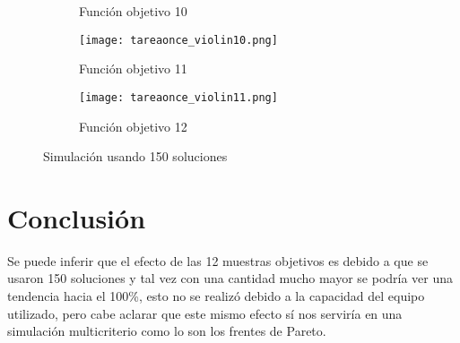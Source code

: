 \documentclass{article}
\begin{document}
\begin{figure}[H]
\begin{subfigure}[b]{0.30\linewidth}
           \caption{Funci\'on objetivo 10}
           \label{fig:westminster_lateral}
        \end{subfigure}
        \begin{subfigure}[b]{0.30\linewidth}
           \texttt{[image: tareaonce\_violin10.png]}
           \caption{Funci\'on objetivo 11}
           \label{fig:westminster_lateral}
        \end{subfigure}
        \begin{subfigure}[b]{0.30\linewidth}
           \texttt{[image: tareaonce\_violin11.png]}
           \caption{Funci\'on objetivo 12}
           \label{fig:westminster_lateral}
        \end{subfigure}
        \caption{Simulaci\'on usando 150 soluciones}
        \label{fig:westminster}
\end{figure}

\newpage
\section{Conclusi\'on}

Se puede inferir que el efecto de las 12 muestras objetivos es debido a que se usaron 150 soluciones y tal vez con una cantidad mucho mayor se podr\'ia ver una tendencia hacia el 100\%, esto no se realiz\'o debido a la capacidad del equipo utilizado, pero cabe aclarar que este mismo efecto s\'i nos servir\'ia en una simulaci\'on multicriterio como lo son los frentes de Pareto. 



\end{document}
